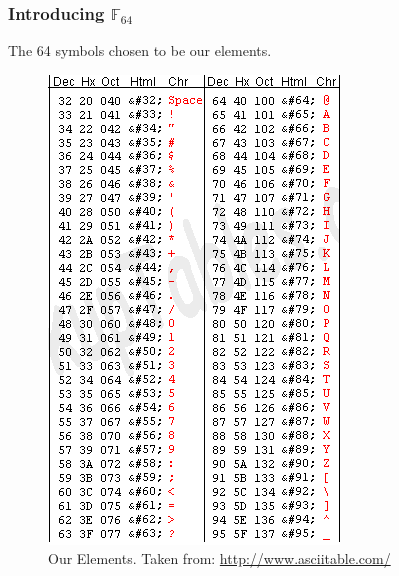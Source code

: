 \documentclass{beamer}
\begin{document}
\begin{frame}
	\frametitle{Introducing $\mathbb{F}_{64}$}
	The 64 symbols chosen to be our elements.
	
	\begin{figure}
	\centering
	\includegraphics[height=0.7\textheight]{ASCIITABLE.png}
	\caption{Our Elements. \linebreak Taken from: \url{http://www.asciitable.com/}}
	\label{fig:ASCII}
	\end{figure}
\end{frame}

\end{document}
